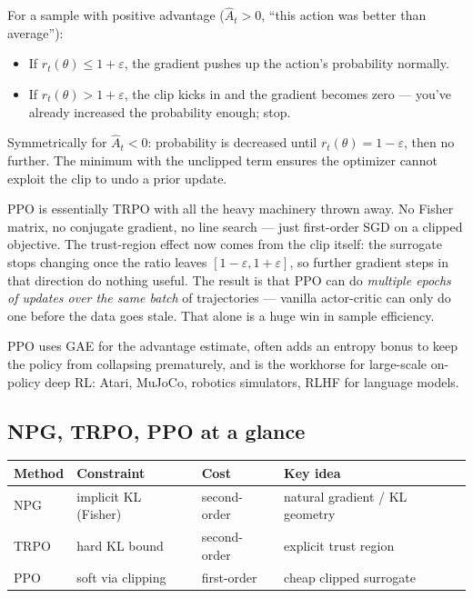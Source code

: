 \documentclass[11pt, oneside]{book}
\begin{document}
\begin{thmbox}[title={PPO's clipped objective in plain English}]
For a sample with positive advantage ($\hat A_t > 0$, ``this action was better than average''):
\begin{itemize}
  \item If $r_t(\theta) \le 1 + \varepsilon$, the gradient pushes up the action's
    probability normally.
  \item If $r_t(\theta) > 1 + \varepsilon$, the clip kicks in and the gradient becomes
    zero --- you've already increased the probability enough; stop.
\end{itemize}
Symmetrically for $\hat A_t < 0$: probability is decreased until $r_t(\theta) = 1 - \varepsilon$,
then no further.
The minimum with the unclipped term ensures the optimizer cannot exploit the clip
to undo a prior update.
\end{thmbox}

\begin{intbox}
PPO is essentially TRPO with all the heavy machinery thrown away.
No Fisher matrix, no conjugate gradient, no line search --- just first-order SGD on a
clipped objective.
The trust-region effect now comes from the clip itself: the surrogate stops changing
once the ratio leaves $[1-\varepsilon, 1+\varepsilon]$, so further gradient steps in
that direction do nothing useful.
The result is that PPO can do \emph{multiple epochs of updates over the same batch}
of trajectories --- vanilla actor-critic can only do one before the data goes stale.
That alone is a huge win in sample efficiency.
\end{intbox}

PPO uses GAE for the advantage estimate, often adds an entropy bonus to keep the
policy from collapsing prematurely, and is the workhorse for large-scale on-policy
deep RL: Atari, MuJoCo, robotics simulators, RLHF for language models.

\subsection{NPG, TRPO, PPO at a glance}

\begin{center}
\begin{tabular}{llll}
\toprule
\textbf{Method} & \textbf{Constraint} & \textbf{Cost} & \textbf{Key idea} \\
\midrule
NPG  & implicit KL (Fisher) & second-order & natural gradient / KL geometry \\
TRPO & hard KL bound        & second-order & explicit trust region \\
PPO  & soft via clipping    & first-order  & cheap clipped surrogate \\
\bottomrule
\end{tabular}
\end{center}
\end{document}
